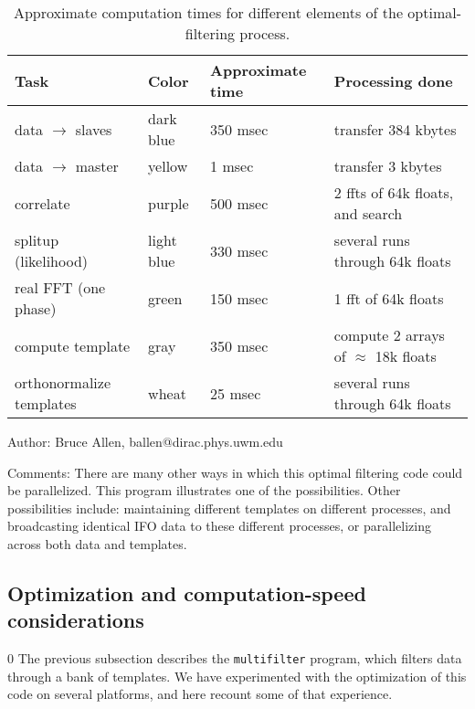 \begin{table}
\begin{tabular}[]{llll}
Task                      &   Color       &   Approximate time  & Processing done \\
\hline
data $\rightarrow$ slaves &  dark blue    &   350 msec          & transfer 384 kbytes  \\
data $\rightarrow$ master &  yellow       &   1 msec            & transfer 3 kbytes    \\
correlate                 &  purple       &   500 msec          & 2 ffts of 64k floats, and search\\
splitup (likelihood)      &  light blue   &   330 msec          & several runs through 64k floats \\
real FFT (one phase)      &  green        &   150 msec          & 1 fft of 64k floats \\
compute template          &  gray         &   350 msec          & compute 2 arrays of $\approx$ 18k floats \\
orthonormalize templates  &  wheat        &   25 msec           & several runs through 64k floats
\end{tabular}
\caption{\label{t:compute} Approximate computation times for different
elements of the optimal-filtering process.}
\end{table}

\begin{description}
\item{Author:}
Bruce Allen, ballen@dirac.phys.uwm.edu
\item{Comments:}
There are many other ways in which this optimal filtering code could be
parallelized.  This program illustrates one of the possibilities.
Other possibilities include: maintaining different templates on
different processes, and broadcasting identical IFO data to these
different processes, or parallelizing across both data and templates.
\end{description}

\clearpage
{}
\clearpage

\subsection{Optimization and computation-speed considerations}
\setcounter{equation}0
The previous subsection describes the {\tt multifilter} program, which
filters data through a bank of templates.  We have experimented with the
optimization of this code on several platforms, and here recount some
of that experience.

